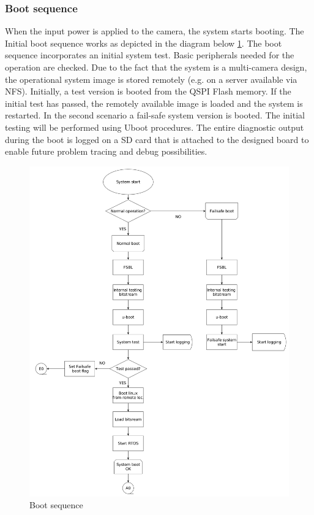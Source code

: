 \subsubsection{Boot sequence}
When the input power is applied to the camera, the system starts booting. The Initial boot sequence works as depicted in the diagram below \ref{fig:bootseq}.
The boot sequence incorporates an initial system test. Basic peripherals needed for the operation are checked. Due to the fact that the system is a multi-camera design, the operational system image is stored remotely (e.g. on a server available via NFS). 
Initially, a test version is booted from the QSPI Flash memory. If the initial test has passed, the remotely available image is loaded and the system is restarted. In the second scenario a fail-safe system version is booted. 
The initial testing will be performed using Uboot procedures. The entire diagnostic output during the boot is logged on a SD card that is attached to the designed board to enable future problem tracing and debug possibilities.

\begin{figure}[H]
\centering
\includegraphics[width=1.0\textwidth]{pict/bootseq.png}
\caption{Boot sequence}
\label{fig:bootseq}
\end{figure}

